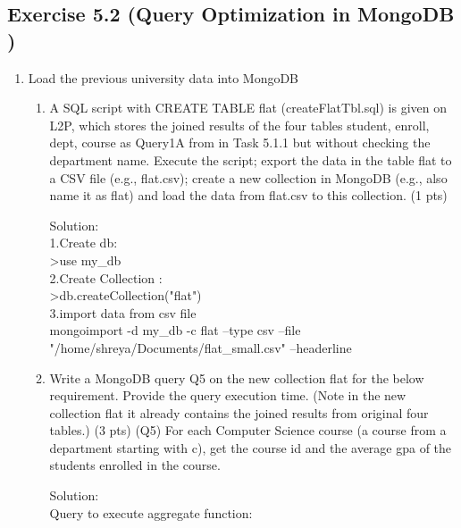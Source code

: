 \documentclass[10pt]{article}
\begin{document}
		\subsection*{Exercise 5.2 (Query Optimization in MongoDB )}
		\begin{enumerate}
			\item Load the previous university data into MongoDB
			\begin{enumerate}
				\item A SQL script with CREATE TABLE flat (createFlatTbl.sql) is given on L2P, which
				stores the joined results of the four tables student, enroll, dept, course as Query1A from
				in Task 5.1.1 but without checking the department name. Execute the script; export the
				data in the table flat to a CSV file (e.g., flat.csv); create a new collection in MongoDB
				(e.g., also name it as flat) and load the data from flat.csv to this collection. (1 pts)
				
				Solution:
				\\1.Create db:
				\\>use my\_db
				\\2.Create Collection :
				\\>db.createCollection("flat")
				\\3.import data from csv file
				\\ mongoimport -d my\_db -c flat --type csv --file "/home/shreya/Documents/flat\_small.csv" --headerline
				
				

				\item  Write a MongoDB query Q5 on the new collection flat for the below requirement.
				Provide the query execution time. (Note in the new collection flat it already contains
				the joined results from original four tables.) (3 pts)
				(Q5) For each Computer Science course (a course from a department starting with c),
				get the course id and the average gpa of the students enrolled in the course.
				
				Solution:
				\\Query to execute aggregate function:
				

\end{enumerate}
\end{enumerate}
\end{document}
